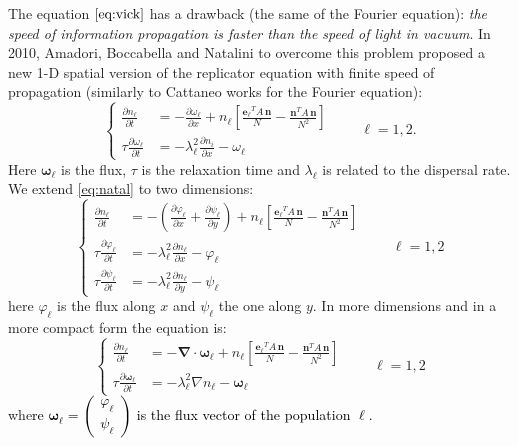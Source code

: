The equation $\ref{eq:vick}$ has a drawback (the same of the Fourier
equation): \textit{the speed of information propagation is faster
than the speed of light in vacuum}. In 2010, Amadori, Boccabella and
Natalini \cite{amadori_one_2010} to overcome this problem proposed
a new 1-D spatial version of the replicator equation with finite speed
of propagation (similarly to Cattaneo works for the Fourier equation):
\begin{equation}
\begin{cases}
\frac{\partial n_{\ell}}{\partial t} & =-\frac{\partial\omega_{\ell}}{\partial x}+n_{\ell}\left[\frac{\mathbf{e_{\ell}}^{T}A\,\mathbf{n}}{N}-\frac{\mathbf{n}^{T}A\,\mathbf{n}}{N^{2}}\right]\\
\tau\frac{\partial\omega_{\ell}}{\partial t} & =-\lambda_{\ell}^{2}\frac{\partial n_{i}}{\partial x}-\omega_{\ell}
\end{cases}\qquad\ell=1,2.\label{eq:natal}
\end{equation}
Here $\mathbf{\omega_{\ell}}$ is the flux, $\tau$ is the relaxation
time and $\lambda_{\ell}$ is related to the dispersal rate. We extend
\ref{eq:natal} to two dimensions:
\begin{equation}
\begin{cases}
\frac{\partial n_{\ell}}{\partial t} & =-\left(\frac{\partial\varphi_{\ell}}{\partial x}+\frac{\partial\psi_{\ell}}{\partial y}\right)+n_{\ell}\left[\frac{\mathbf{e_{\ell}}^{T}A\,\mathbf{n}}{N}-\frac{\mathbf{n}^{T}A\,\mathbf{n}}{N^{2}}\right]\\
\tau\frac{\partial\varphi_{\ell}}{\partial t} & =-\lambda_{\ell}^{2}\frac{\partial n_{\ell}}{\partial x}-\varphi_{\ell}\\
\tau\frac{\partial\psi_{\ell}}{\partial t} & =-\lambda_{\ell}^{2}\frac{\partial n_{\ell}}{\partial y}-\psi_{\ell}
\end{cases}\qquad\ell=1,2\label{eq:2d_nat}
\end{equation}
 here $\varphi_{\ell}$ is the flux along $x$ and $\psi_{\ell}$
the one along $y$. In more dimensions and in a more compact form
the equation is:
\[
\begin{cases}
\frac{\partial n_{\ell}}{\partial t} & =-\bm{\nabla}\cdot\bm{\omega}_{\ell}+n_{\ell}\left[\frac{\mathbf{e_{\ell}}^{T}A\,\mathbf{n}}{N}-\frac{\mathbf{n}^{T}A\,\mathbf{n}}{N^{2}}\right]\\
\tau\frac{\partial\bm{\omega}_{\ell}}{\partial t} & =-\lambda_{\ell}^{2}\nabla n_{\ell}-\bm{\omega}_{\ell}
\end{cases}\qquad\ell=1,2
\]
whe\textcolor{black}{re $\bm{\omega}_{\ell}=\left(\begin{array}{c}
\varphi_{\ell}\\
\psi_{\ell}
\end{array}\right)$ is the flux vector of the population $\ell$.}

